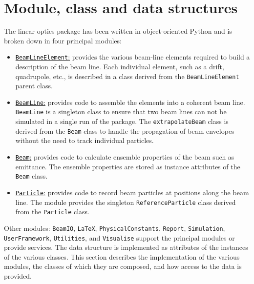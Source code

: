 \graphicspath{ {A1-MCD/Figures/} }

\section{Module, class and data structures}

The linear optics package has been written in object-oriented Python
and is broken down in four principal modules:
\begin{itemize}
  \item \underline{\texttt{BeamLineElement}:} provides the various
    beam-line elements required to build a description of the beam
    line.
    Each individual element, such as a drift, quadrupole, etc., is
    described in a class derived from the \texttt{BeamLineElement}
    parent class.
  \item \underline{\texttt{BeamLine}:} provides code to assemble the
    elements into a coherent beam line.
    \texttt{BeamLine} is a singleton class to ensure that two beam
    lines can not be simulated in a single run of the package.
    The \texttt{extrapolateBeam} class is derived from
    the \texttt{Beam} class to handle the propagation of beam
    envelopes without the need to track individual particles.
  \item \underline{\texttt{Beam}:} provides code to calculate
    ensemble properties of the beam such as emittance.
    The ensemble properties are stored as instance attributes of
    the \texttt{Beam} class.
  \item \underline{\texttt{Particle}:} provides code to record beam
    particles at positions along the beam line.
    The module provides the singleton \texttt{ReferenceParticle}
    class derived from the \texttt{Particle} class.
\end{itemize}
Other modules: \texttt{BeamIO}, \texttt{LaTeX},
\texttt{PhysicalConstants}, \texttt{Report}, \texttt{Simulation},
\texttt{UserFramework}, \texttt{Utilities}, and \texttt{Visualise}
support the principal modules or provide services.
The data structure is implemented as attributes of the instances of the 
various classes.
This section describes the implementation of the various modules, the
classes of which they are composed, and how access to the data is
provided.

